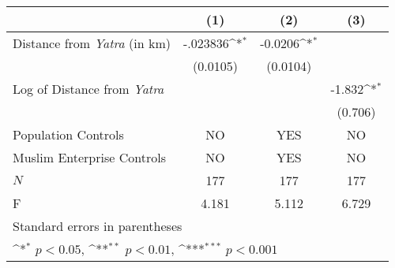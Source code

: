 {
\def\sym#1{\ifmmode^{#1}\else\(^{#1}\)\fi}
\begin{tabular}{l*{3}{c}}
\hline\hline
            &\multicolumn{1}{c}{(1)}&\multicolumn{1}{c}{(2)}&\multicolumn{1}{c}{(3)}\\
[1em]
\hline
Distance from \textit{Yatra} (in km) &      -.023836\sym{*}  &          -0.0206\sym{*}  &                     \\
            &    (0.0105)          &   (0.0104)         &                     \\
[1em]
Log of Distance from \textit{Yatra}   &                      &                     &      -1.832\sym{*} \\
            &                     &                     &     (0.706)         \\
[1em]
\hline
Population Controls      &       NO &  YES & NO \\
[1em]
Muslim Enterprise Controls      &       NO &  YES & NO \\
 
\hline
\(N\)       &         177         &         177         &         177         \\
F           &       4.181          &       5.112         &       6.729         \\
\hline\hline
\multicolumn{4}{l}{\footnotesize Standard errors in parentheses}\\
\multicolumn{4}{l}{\footnotesize \sym{*} \(p<0.05\), \sym{**} \(p<0.01\), \sym{***} \(p<0.001\)}\\
\end{tabular}
}
